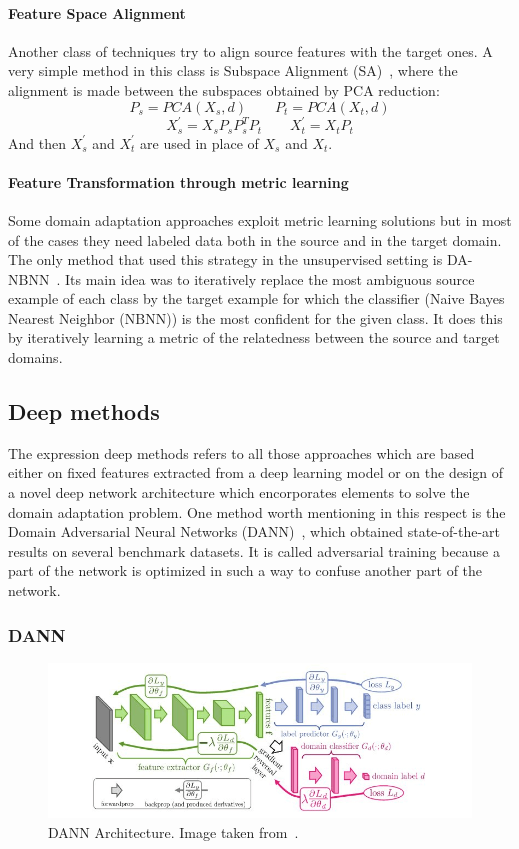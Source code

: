 \documentclass[../main.tex]{subfiles}
\begin{document}
	\paragraph{Feature Space Alignment}
	Another class of techniques try to align source features with the target ones. A very simple method in this class is
	Subspace Alignment (SA)~\cite{subspace-alignment}, where the alignment is made between the subspaces obtained by PCA reduction:
	$$ P_{s} = PCA(X_{s}, d) \qquad P_{t} = PCA(X_{t}, d) $$
	$$ X_{s}^{'} = X_{s}P_{s}P_{s}^{T}P_{t} \qquad X_{t}^{'} = X_{t} P_{t} $$
	And then $X_{s}^{'}$ and $X_{t}^{'}$ are used in place of $X_{s}$ and $X_{t}$.

	\paragraph{Feature Transformation through metric learning}
	Some domain adaptation approaches exploit metric learning solutions but in most of the cases they need labeled data both in the source
    and in the target domain. The only method that used this strategy in the unsupervised setting is DA-NBNN~\cite{da-nbnn}.
    Its main idea was to iteratively replace the most ambiguous
	source example of each class by the target example for which the classifier (Naive Bayes Nearest Neighbor (NBNN)) is the
	most confident for the given class. It does this by iteratively learning a metric of the relatedness between the source and
	target domains.

    \subsection{Deep methods}
	The expression deep methods refers to all those approaches which are based either on fixed features extracted from a deep learning
    model or on the design of a novel deep network architecture which encorporates elements to solve the domain adaptation problem.
    One method worth mentioning in this respect is the Domain Adversarial Neural Networks (DANN)~\cite{DANN}, which obtained state-of-the-art
    results on several benchmark datasets. It is called adversarial training because a part of the network is optimized in such a way
    to confuse another part of the network.

    \subsubsection{DANN}
      \begin{figure}[!ht]
          \centering{}
      	\includegraphics[width=\linewidth]{img/dann-architecture.png}
          \caption{DANN Architecture. Image taken from~\cite{DANN}.}\label{fig:dann-architecture}
  	  \end{figure}
\end{document}
